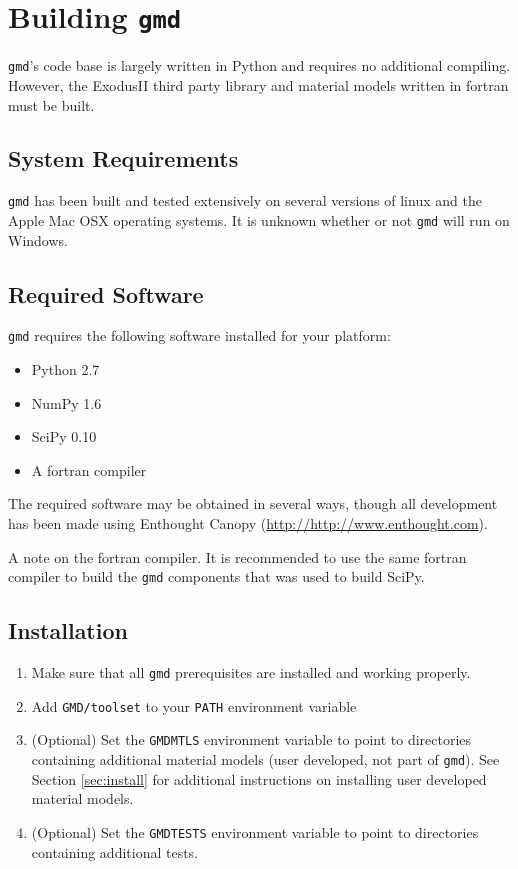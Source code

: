 \documentclass[11pt]{report}
\newcommand{\gmd}{\texttt{gmd}}
\begin{document}
\chapter{Building \gmd}
\gmd's code base is largely written in Python and requires no additional
compiling.  However, the ExodusII third party library and material models
written in fortran must be built.

\section{System Requirements}
\gmd{} has been built and tested extensively on several versions of linux and
the Apple Mac OSX operating systems. It is unknown whether or not \gmd{}
will run on Windows.


\section{Required Software}
\gmd{} requires the following software installed for your platform:

\begin{itemize}
  \item Python 2.7
  \item NumPy 1.6
  \item SciPy 0.10
  \item A fortran compiler
\end{itemize}

The required software may be obtained in several ways, though all development
has been made using Enthought Canopy (\url{http://http://www.enthought.com}).

A note on the fortran compiler.  It is recommended to use the same fortran
compiler to build the \gmd{} components that was used to build SciPy.

\section{Installation}
\begin{enumerate}
  \item Make sure that all \gmd{} prerequisites are installed and working properly.
  \item Add \verb|GMD/toolset| to your \texttt{PATH} environment variable
  \item (Optional) Set the \texttt{GMDMTLS} environment variable to point to
  directories containing additional material models (user developed, not part
  of \gmd{}). See Section \ref{sec:install} for additional instructions on
  installing user developed material models.
  \item (Optional) Set the \texttt{GMDTESTS} environment variable to point to
  directories containing additional tests.
\end{enumerate}
\end{document}
